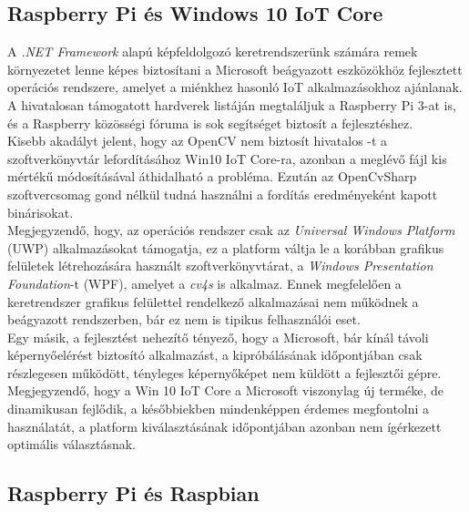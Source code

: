 \subsection{Raspberry Pi és Windows 10 IoT Core} \label{rpi-win10iot}

A \emph{.NET Framework} alapú képfeldolgozó keretrendszerünk számára remek környezetet lenne képes biztosítani a Microsoft beágyazott eszközökhöz fejlesztett operációs rendszere, amelyet a miénkhez hasonló IoT alkalmazásokhoz ajánlanak. A hivatalosan támogatott hardverek listáján megtaláljuk a Raspberry Pi 3-at is, és a Raspberry közösségi fóruma is sok segítséget biztosít a fejlesztéshez. \\
Kisebb akadályt jelent, hogy az OpenCV nem biztosít hivatalos -t a szoftverkönyvtár lefordításához Win10 IoT Core-ra, azonban a meglévő fájl kis mértékű módosításával áthidalható a probléma. \cite{win10-compile} Ezután az OpenCvSharp szoftvercsomag gond nélkül tudná használni a fordítás eredményeként kapott binárisokat. \\
Megjegyzendő, hogy, az operációs rendszer csak az \emph{Universal Windows Platform} (UWP) alkalmazásokat támogatja, ez a platform váltja le a korábban grafikus felületek létrehozására használt szoftverkönyvtárat, a \emph{Windows Presentation Foundation}-t (WPF), amelyet a \emph{cv4s} is alkalmaz. Ennek megfelelően a keretrendszer grafikus felülettel rendelkező alkalmazásai nem működnek a beágyazott rendszerben, bár ez nem is tipikus felhasználói eset.\\
Egy másik, a fejlesztést nehezítő tényező, hogy a Microsoft, bár kínál távoli képernyőelérést biztosító alkalmazást, a kipróbálásának időpontjában csak részlegesen működött, tényleges képernyőképet nem küldött a fejlesztői gépre. Megjegyzendő, hogy a Win 10 IoT Core a Microsoft viszonylag új terméke, de dinamikusan fejlődik, a későbbiekben mindenképpen érdemes megfontolni a használatát, a platform kiválasztásának időpontjában azonban nem ígérkezett optimális választásnak.

\subsection{Raspberry Pi és Raspbian}

